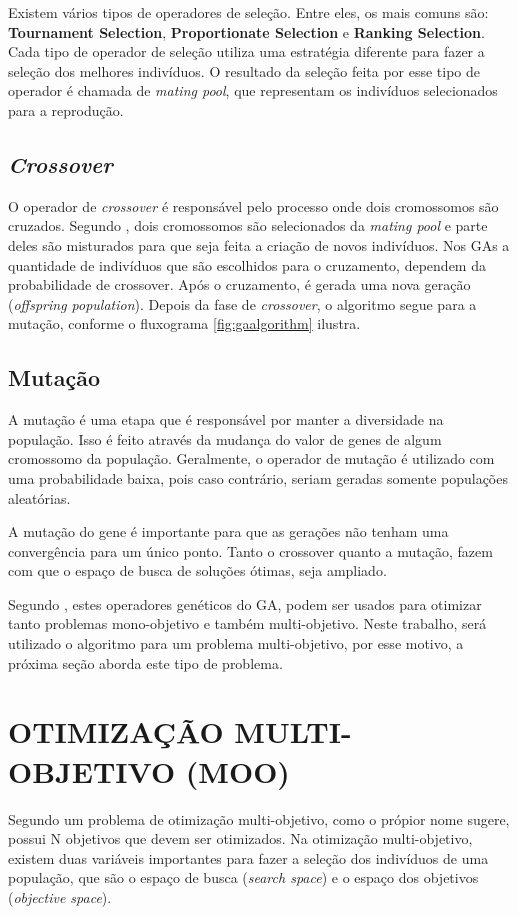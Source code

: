 Existem vários tipos de operadores de seleção. Entre eles, os mais comuns são: 
\textbf{Tournament Selection}, \textbf{Proportionate Selection} e 
\textbf{Ranking Selection}. Cada tipo de operador de seleção utiliza uma estratégia diferente 
para fazer a seleção dos melhores indivíduos. O resultado da seleção 
feita por esse tipo de operador é chamada de \textit{mating pool}, que representam 
os indivíduos selecionados para a reprodução.

\subsection{\textit{Crossover}}
O operador de \textit{crossover} é responsável pelo processo onde dois cromossomos 
são cruzados. Segundo \cite{ghosh}, dois cromossomos são selecionados da \textit{mating pool}
e parte deles são misturados para que seja feita a criação de novos indivíduos. 
Nos GAs a quantidade de indivíduos que são escolhidos para o cruzamento, dependem da probabilidade
de crossover. Após o cruzamento, é gerada uma nova geração (\textit{offspring population}). 
Depois da fase de \textit{crossover}, o algoritmo segue para a mutação,
conforme o fluxograma \ref{fig:gaalgorithm} ilustra.

\subsection{Mutação}
A mutação é uma etapa que é responsável por manter a diversidade na população. Isso
é feito através da mudança do valor de genes de algum cromossomo da população. Geralmente, o operador
de mutação é utilizado com uma probabilidade baixa, pois caso contrário, seriam
geradas somente populações aleatórias. 

A mutação do gene é importante para que as gerações não tenham uma convergência para 
um único ponto. Tanto o crossover quanto a mutação, fazem com que o espaço de busca
de soluções ótimas, seja ampliado. 

Segundo \cite{ghosh}, estes operadores genéticos do GA, podem ser usados para otimizar tanto
problemas mono-objetivo e também multi-objetivo. Neste trabalho, será utilizado
o algoritmo para um problema multi-objetivo, por esse motivo, a próxima seção aborda
este tipo de problema.

\section{OTIMIZAÇÃO MULTI-OBJETIVO (MOO)} 
Segundo \cite{ghosh} um problema de otimização multi-objetivo, como
o própior nome sugere, possui N objetivos que devem ser otimizados. 
Na otimização multi-objetivo, existem duas variáveis importantes
para fazer a seleção dos indivíduos de uma população,
que são o espaço de busca (\textit{search space}) e o 
espaço dos objetivos (\textit{objective space}).

